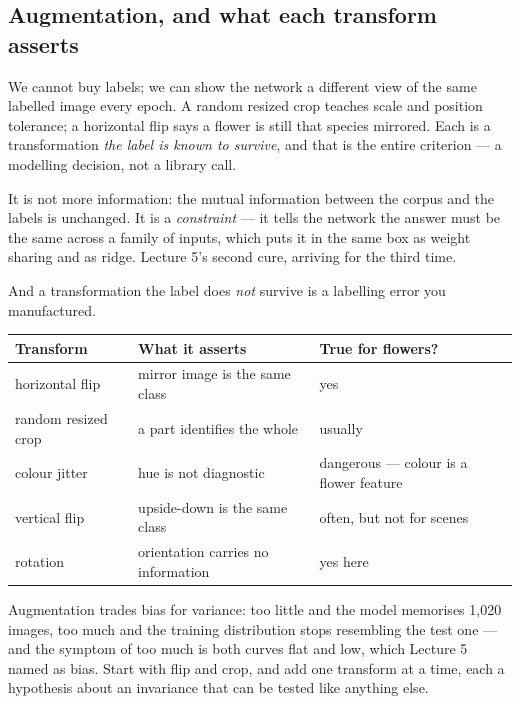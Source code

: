 \documentclass[11pt,a4paper]{article}
\begin{document}
\subsection{Augmentation, and what each transform asserts}

We cannot buy labels; we can show the network a different view of the same
labelled image every epoch. A random resized crop teaches scale and position
tolerance; a horizontal flip says a flower is still that species mirrored. Each
is a transformation \emph{the label is known to survive}, and that is the
entire criterion --- a modelling decision, not a library call.

\begin{keybox}[title={What augmentation is not}]
It is not more information: the mutual information between the corpus and the
labels is unchanged. It is a \emph{constraint} --- it tells the network the
answer must be the same across a family of inputs, which puts it in the same
box as weight sharing and as ridge. Lecture 5's second cure, arriving for the
third time.

And a transformation the label does \emph{not} survive is a labelling error you
manufactured.
\end{keybox}

\begin{center}
\small
\begin{tabular}{llp{}}
\toprule
\textbf{Transform} & \textbf{What it asserts} & \textbf{True for flowers?} \\
\midrule
horizontal flip & mirror image is the same class & yes \\
random resized crop & a part identifies the whole & usually \\
colour jitter & hue is not diagnostic & dangerous --- colour is a flower
                                        feature \\
vertical flip & upside-down is the same class & often, but not for scenes \\
rotation & orientation carries no information & yes here \\
\bottomrule
\end{tabular}
\end{center}

Augmentation trades bias for variance: too little and the model memorises
1{,}020 images, too much and the training distribution stops resembling the
test one --- and the symptom of too much is both curves flat and low, which
Lecture 5 named as bias. Start with flip and crop, and add one transform at a
time, each a hypothesis about an invariance that can be tested like anything
else.
\end{document}
